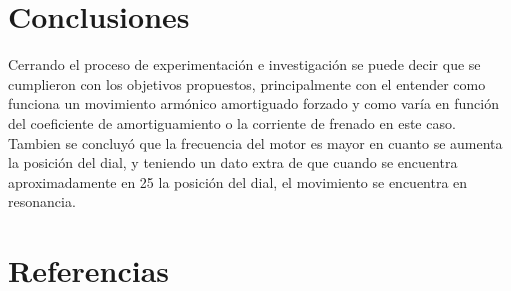 \documentclass[spanish,notitlepage,letterpaper, 12pt]{article}
\begin{document}
\section{Conclusiones}
Cerrando el proceso de experimentación e investigación se puede decir que se cumplieron con los objetivos propuestos, principalmente con el entender como funciona un movimiento armónico amortiguado forzado y como varía en función del coeficiente de amortiguamiento o la corriente de frenado en este caso. Tambien se concluyó que la frecuencia del motor es mayor en cuanto se aumenta la posición del dial, y teniendo un dato extra de que cuando se encuentra aproximadamente en 25 la posición del dial, el movimiento se encuentra en resonancia.
\section{Referencias} 


\end{document}
